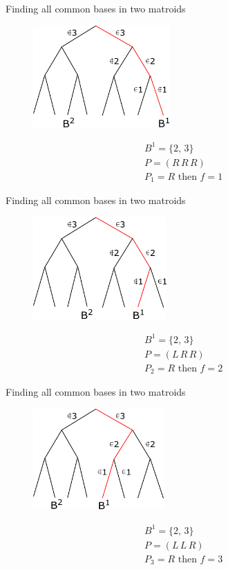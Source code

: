 \documentclass[11pt,xcolor=dvipsnames,table,dvipdfmx]{beamer}
\begin{document}
\begin{frame}{Finding all common bases in two matroids}
 \begin{figure}
  \centering
  \hspace{0.2cm}
  \includegraphics[width=5.2cm]{text4989.png}
 \end{figure}
 \begin{align*}
  &B^1 = \{2,\,3\}\\
  &P = (R\,R\,R)\\
  &P_1 = R \text{ then } f = 1
 \end{align*}
\end{frame}

\begin{frame}{Finding all common bases in two matroids}
 \begin{figure}
  \centering
  \hspace{0.1cm}
  \includegraphics[width=5.1cm]{text4989-2.png}
 \end{figure}
 \begin{align*}
  &B^1 = \{2,\,3\}\\
  &P = (L\,R\,R)\\
  &P_2 = R \text{ then } f = 2
 \end{align*}
\end{frame}

\begin{frame}{Finding all common bases in two matroids}
 \begin{figure}
  \centering
  \hspace{0.03cm}
  \includegraphics[width=5cm]{text4989-3.png}
 \end{figure}
 \begin{align*}
  &B^1 = \{2,\,3\}\\
  &P = (L\,L\,R)\\
  &P_3 = R \text{ then } f = 3
 \end{align*}
\end{frame}
\end{document}
